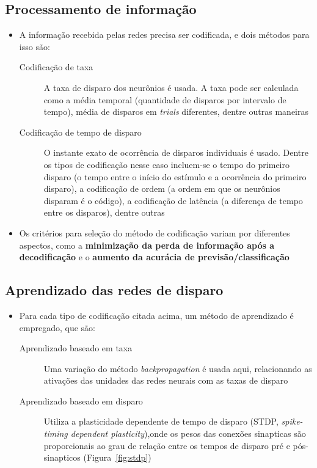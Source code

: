 \subsection{Processamento de informação}
\begin{itemize}
	\item A informação recebida pelas redes precisa ser codificada, e dois métodos para isso são:
	\begin{description}
		\item[Codificação de taxa] A taxa de disparo dos neurônios é usada. A taxa pode ser calculada como a média temporal (quantidade de disparos por intervalo de tempo), média de disparos em \textit{trials} diferentes, dentre outras maneiras
		\item[Codificação de tempo de disparo] O instante exato de ocorrência de disparos individuais é usado. Dentre os tipos de codificação nesse caso incluem-se o tempo do primeiro disparo (o tempo entre o início do estímulo e a ocorrência do primeiro disparo), a codificação de ordem (a ordem em que os neurônios disparam é o código), a codificação de latência (a diferença de tempo entre os disparos), dentre outras
	\end{description}
	\item Os critérios para seleção do método de codificação variam por diferentes aspectos, como a \textbf{minimização da perda de informação após a decodificação} e o \textbf{aumento da acurácia de previsão/classificação}
\end{itemize}

\subsection{Aprendizado das redes de disparo}
\begin{itemize}
	\item Para cada tipo de codificação citada acima, um método de aprendizado é empregado, que são:
	\begin{description}
		\item[Aprendizado baseado em taxa] Uma variação do método \textit{backpropagation} é usada aqui, relacionando as ativações das unidades das redes neurais com as taxas de disparo
		\item[Aprendizado baseado em disparo] Utiliza a plasticidade dependente de tempo de disparo (STDP, \textit{spike-timing dependent plasticity}),onde os pesos das conexões sinapticas são proporcionais ao grau de relação entre os tempos de disparo pré e pós-sinapticos (Figura~\ref{fig:stdp})
	\end{description}
\end{itemize}

